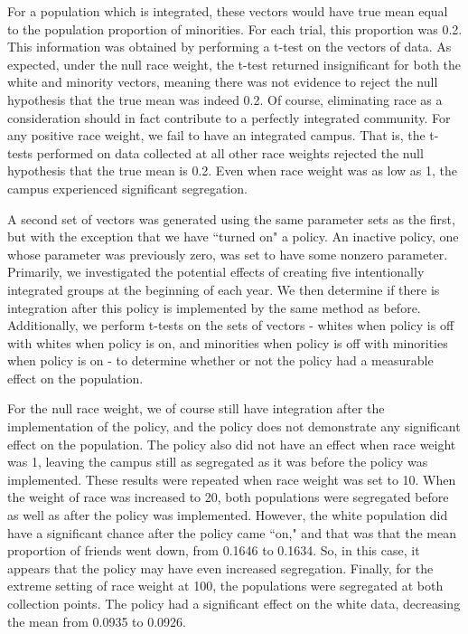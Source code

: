 For a population which is integrated, these vectors would have true mean equal to the population proportion of minorities.
For each trial, this proportion was 0.2. This information was obtained by performing a t-test on the vectors of data. As 
expected, under the null race weight, the t-test returned insignificant for both the white and minority vectors, meaning 
there was not evidence to reject the null hypothesis that the true mean was indeed 0.2. Of course, eliminating race as a 
consideration should in fact contribute to a perfectly integrated community. For any positive race weight, we fail to have 
an integrated campus. That is, the t-tests performed on data collected at all other race weights rejected the null hypothesis 
that the true mean is 0.2. Even when race weight was as low as 1, the campus experienced significant segregation.

A second set of vectors was generated using the same parameter sets as the first, but with the exception that we have ``turned 
on" a policy. An inactive policy, one whose parameter was previously zero, was set to have some nonzero parameter. Primarily, 
we investigated the potential effects of creating five intentionally integrated groups at the beginning of each year. We then 
determine if there is integration after this policy is implemented by the same method as before. Additionally, we perform 
t-tests on the sets of vectors - whites when policy is off with whites when policy is on, and minorities when policy is off 
with minorities when policy is on - to determine whether or not the policy had a measurable effect on the population. 

For the null race weight, we of course still have integration after the implementation of the policy, and the policy does not 
demonstrate any significant effect on the population. The policy also did not have an effect when race weight was 1, leaving 
the campus still as segregated as it was before the policy was implemented. These results were repeated when race weight was 
set to 10. When the weight of race was increased to 20, both populations were segregated before as well as after the policy 
was implemented. However, the white population did have a significant chance after the policy came ``on," and that was that 
the mean proportion of friends went down, from 0.1646 to 0.1634. So, in this case, it appears that the policy may have even 
increased segregation. Finally, for the extreme setting of race weight at 100, the populations were segregated at both 
collection points. The policy had a significant effect on the white data, decreasing the mean from 0.0935 to 0.0926.

